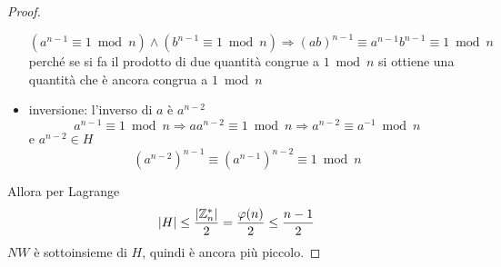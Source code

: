 \begin{theorem}
\begin{proof}
\begin{itemize}
\begin{equation*}
                    \left( 
                        a^{n-1} \equiv 1 \bmod n 
                    \right)
                    \wedge
                    \left( 
                        b^{n-1} \equiv 1 \bmod n 
                    \right)
                    \Rightarrow
                    \left( ab \right)^{n-1} \equiv
                    a^{n-1} b^{n-1} \equiv
                    1 \bmod n 
                \end{equation*}
                perché se si fa il prodotto di due quantità congrue a $1 \bmod n $ si ottiene una quantità che è ancora congrua a $1 \bmod n $
            \item inversione:
                l'inverso di $a$ è $a^{n-2}$
                \begin{equation*}
                    a^{n-1} \equiv 1 \bmod n 
                    \Rightarrow
                    a a^{n-2} \equiv 1 \bmod n 
                    \Rightarrow
                    a^{n-2} \equiv 
                    a^{-1} \bmod n 
                \end{equation*}
                e $a^{n-2} \in H$ 
                \begin{equation*}
                    \left( 
                        a^{n-2}
                    \right)^{n-1}
                    \equiv
                    \left( 
                        a^{n-1}
                    \right)^{n-2}
                    \equiv 1 \bmod n 
                \end{equation*}
        \end{itemize}
        Allora per Lagrange
        \begin{equation*}
            |H|
            \leq
            \frac{
                |\mathbb{Z}_{n}^{*}|
            }{2}
            =
            \frac{
                \varphi(n)
            }{2}
            \leq
            \frac{n-1}{2}
        \end{equation*}
        $NW$ è sottoinsieme di $H$, quindi è ancora più piccolo.
    \end{proof}
\end{theorem}

